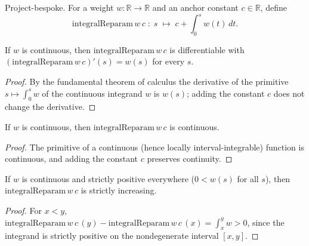 \begin{definition}

  \label{def:integral_reparam}
  Project-bespoke. For a weight $w:\mathbb R\to\mathbb R$ and an anchor constant
  $c\in\mathbb R$, define
  \[
    \mathrm{integralReparam}\,w\,c \;:\; s \;\longmapsto\; c + \int_0^{s} w(t)\,dt .
  \]
\end{definition}

\begin{lemma}

  \label{lem:has_deriv_integral_reparam}
  If $w$ is continuous, then $\mathrm{integralReparam}\,w\,c$ is differentiable with
  $(\mathrm{integralReparam}\,w\,c)'(s) = w(s)$ for every $s$.
\end{lemma}
\begin{proof}
  \leanok
  By the fundamental theorem of calculus the derivative of the primitive
  $s\mapsto\int_0^{s}w$ of the continuous integrand $w$ is $w(s)$; adding the
  constant $c$ does not change the derivative.
\end{proof}

\begin{lemma}

  \label{lem:continuous_integral_reparam}
  If $w$ is continuous, then $\mathrm{integralReparam}\,w\,c$ is continuous.
\end{lemma}
\begin{proof}
  \leanok
  The primitive of a continuous (hence locally interval-integrable) function is
  continuous, and adding the constant $c$ preserves continuity.
\end{proof}

\begin{lemma}

  \label{lem:strict_mono_integral_reparam}
  If $w$ is continuous and strictly positive everywhere ($0<w(s)$ for all $s$), then
  $\mathrm{integralReparam}\,w\,c$ is strictly increasing.
\end{lemma}
\begin{proof}
  \leanok
  For $x<y$,
  $\mathrm{integralReparam}\,w\,c\,(y)-\mathrm{integralReparam}\,w\,c\,(x)
  =\int_x^y w>0$, since the integrand is strictly positive on the nondegenerate
  interval $[x,y]$.
\end{proof}

